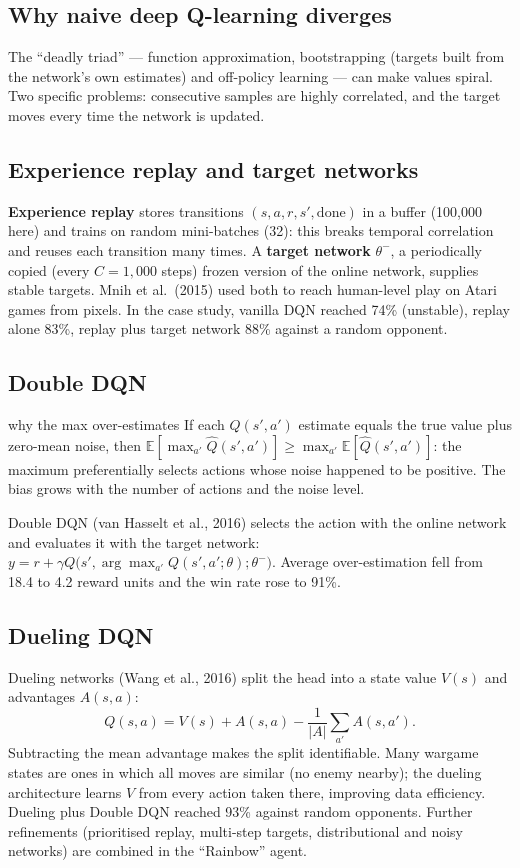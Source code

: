 \documentclass[11pt]{article}
\begin{document}
\subsection{Why naive deep Q-learning diverges}
The ``deadly triad'' --- function approximation, bootstrapping (targets built from the network's own estimates) and off-policy learning --- can make values spiral. Two specific problems: consecutive samples are highly correlated, and the target moves every time the network is updated.

\subsection{Experience replay and target networks}
\textbf{Experience replay} stores transitions $(s,a,r,s',\text{done})$ in a buffer (100,000 here) and trains on random mini-batches (32): this breaks temporal correlation and reuses each transition many times. A \textbf{target network} $\theta^-$, a periodically copied (every $C=1{,}000$ steps) frozen version of the online network, supplies stable targets. Mnih et al.\ (2015) used both to reach human-level play on Atari games from pixels. In the case study, vanilla DQN reached 74\% (unstable), replay alone 83\%, replay plus target network 88\% against a random opponent.

\subsection{Double DQN}
\begin{derivation}{why the max over-estimates}
If each $Q(s',a')$ estimate equals the true value plus zero-mean noise, then $\mathbb E[\max_{a'}\hat Q(s',a')]\ge\max_{a'}\mathbb E[\hat Q(s',a')]$: the maximum preferentially selects actions whose noise happened to be positive. The bias grows with the number of actions and the noise level.
\end{derivation}
Double DQN (van Hasselt et al., 2016) selects the action with the online network and evaluates it with the target network: $y=r+\gamma Q\big(s',\arg\max_{a'}Q(s',a';\theta);\theta^-\big)$. Average over-estimation fell from 18.4 to 4.2 reward units and the win rate rose to 91\%.

\subsection{Dueling DQN}
Dueling networks (Wang et al., 2016) split the head into a state value $V(s)$ and advantages $A(s,a)$:
\[Q(s,a)=V(s)+A(s,a)-\frac{1}{|A|}\sum_{a'}A(s,a').\]
Subtracting the mean advantage makes the split identifiable. Many wargame states are ones in which all moves are similar (no enemy nearby); the dueling architecture learns $V$ from every action taken there, improving data efficiency. Dueling plus Double DQN reached 93\% against random opponents. Further refinements (prioritised replay, multi-step targets, distributional and noisy networks) are combined in the ``Rainbow'' agent.
\end{document}
